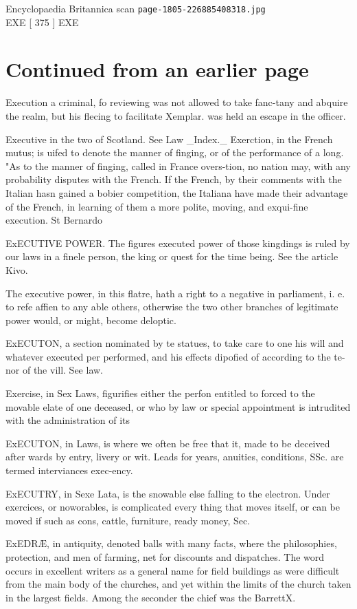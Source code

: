\documentclass{article}
\begin{document}
\begin{center}
{\Large Encyclopaedia Britannica scan \texttt{page-1805-226885408318.jpg}}\\[0.5em]
EXE [ 375 ] EXE
\end{center}
\section*{Continued from an earlier page}
Execution a criminal, fo reviewing was not allowed to take fanc-tany and abquire the realm, but his flecing to facilitate Xemplar. was held an escape in the officer.

Executive in the two of Scotland. See Law \_Index.\_ Exerction, in the French mutus; is uifed to denote the manner of finging, or of the performance of a long. "As to the manner of finging, called in France overs-tion, no nation may, with any probability disputes with the French. If the French, by their comments with the Italian hasn gained a bobier competition, the Italiana have made their advantage of the French, in learning of them a more polite, moving, and exqui-fine execution. St Bernardo

ExECUTIVE POWER. The figures executed power of those kingdings is ruled by our laws in a finele person, the king or quest for the time being. See the article Kivo.

The executive power, in this flatre, hath a right to a negative in parliament, i. e. to refe affien to any able others, otherwise the two other branches of legitimate power would, or might, become deloptic.

ExECUTON, a section nominated by te statues, to take care to one his will and whatever executed per performed, and his effects dipofied of according to the te-nor of the vill. See law.

Exercise, in Sex Laws, figurifies either the perfon entitled to forced to the movable elate of one deceased, or who by law or special appointment is intrudited with the administration of its

ExECUTON, in Laws, is where we often be free that it, made to be deceived after wards by entry, livery or wit. Leads for years, anuities, conditions, SSc. are termed interviances exec-ency.

ExECUTRY, in Sexe Lata, is the snowable else falling to the electron. Under exercices, or noworables, is complicated every thing that moves itself, or can be moved if such as cons, cattle, furniture, ready money, Sec.

ExEDRÆ, in antiquity, denoted balls with many facts, where the philosophies, protection, and men of farming, net for discounts and dispatches. The word occurs in excellent writers as a general name for field buildings as were difficult from the main body of the churches, and yet within the limits of the church taken in the largest fields. Among the seconder the chief was the BarrettX.
\end{document}
